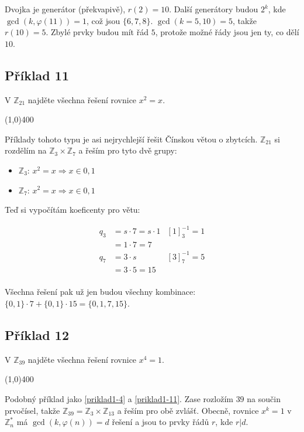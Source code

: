 \documentclass{article}
\begin{document}
Dvojka je generátor (překvapivě), $r(2) = 10$. Další generátory budou $2^k$, kde $\gcd(k, \varphi(11)) = 1$, což jsou $\{6,7,8\}$. $\gcd(k = 5,10) = 5$, takže $r(10) = 5$. Zbylé prvky budou mít řád $5$, protože možné řády jsou jen ty, co dělí $10$.  


\subsection{\label{priklad1-11}Příklad 11}
V $\mathbb{Z}_{21}$ najděte všechna řešení rovnice $x^2 = x$.

\line(1,0){400}

Příklady tohoto typu je asi nejrychlejší řešit Čínskou větou o zbytcích. $\mathbb{Z}_{21}$ si rozdělím na $\mathbb{Z}_{3} \times \mathbb{Z}_{7}$ a řeším pro tyto dvě grupy:

\begin{itemize}
	\item $\mathbb{Z}_{3}$: $x^2 = x \Rightarrow x \in {0,1}$
	\item $\mathbb{Z}_{7}$: $x^2 = x \Rightarrow x \in {0,1}$ 
\end{itemize}

Teď si vypočítám koeficenty pro větu:

\begin{align*}
q_3 & = s\cdot 7 = s\cdot 1 & \left[ 1\right]^{-1}_3 = 1\\
		& = 1 \cdot 7 = 7 \\
q_7 & = 3 \cdot s & \left[ 3\right]^{-1}_{7} = 5\\
		& = 3 \cdot 5 = 15 \\
\end{align*}

Všechna řešení pak už jen budou všechny kombinace: $\{0,1\}\cdot 7 + \{0,1\}\cdot 15 = \{0,1,7,15\}$.

\subsection{\label{priklad1-12}Příklad 12}
V $\mathbb{Z}_{39}$ najděte všechna řešení rovnice $x^4 = 1$.

\line(1,0){400}

Podobný příklad jako \ref{priklad1-4} a \ref{priklad1-11}. Zase rozložím $39$ na součin prvočísel, takže $\mathbb{Z}_{39} = \mathbb{Z}_{3} \times \mathbb{Z}_{13}$ a řeším pro obě zvlášť. Obecně, rovnice $x^k = 1$ v $\mathbb{Z}_n^*$ má $\gcd(k, \varphi(n)) = d$ řešení a jsou to prvky řádů $r$, kde $r|d$.
\end{document}
